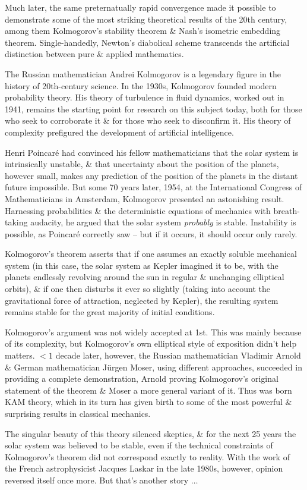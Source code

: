 \documentclass{article}
\begin{document}
\begin{enumerate}
	Much later, the same preternatually rapid convergence made it possible to demonstrate some of the most striking theoretical results of the 20th century, among them {\sc Kolmogorov}'s stability theorem \& {\sc Nash}'s isometric embedding theorem. Single-handedly, {\sc Newton}'s diabolical scheme transcends the artificial distinction between pure \& applied mathematics.
	
	The Russian mathematician {\sc Andrei Kolmogorov} is a legendary figure in the history of 20th-century science. In the 1930s, {\sc Kolmogorov} founded modern probability theory. His theory of turbulence in fluid dynamics, worked out in 1941, remains the starting point for research on this subject today, both for those who seek to corroborate it \& for those who seek to disconfirm it. His theory of complexity prefigured the development of artificial intelligence.
	
	{\sc Henri Poincar\'e} had convinced his fellow mathematicians that the solar system is intrinsically unstable, \& that uncertainty about the position of the planets, however small, makes any prediction of the position of the planets in the distant future impossible. But some 70 years later, 1954, at the International Congress of Mathematicians in Amsterdam, {\sc Kolmogorov} presented an astonishing result. Harnessing probabilities \& the deterministic equations of mechanics with breath-taking audacity, he argued that the solar system {\it probably} is stable. Instability is possible, as {\sc Poincar\'e} correctly saw -- but if it occurs, it should occur only rarely.
	
	{\sc Kolmogorov}'s theorem asserts that if one assumes an exactly soluble mechanical system (in this case, the solar system as {\sc Kepler} imagined it to be, with the planets endlessly revolving around the sun in regular \& unchanging elliptical orbits), \& if one then disturbs it ever so slightly (taking into account the gravitational force of attraction, neglected by {\sc Kepler}), the resulting system remains stable for the great majority of initial conditions.
	
	{\sc Kolmogorov}'s argument was not widely accepted at 1st. This was mainly because of its complexity, but {\sc Kolmogorov}'s own elliptical style of exposition didn't help matters. $< 1$ decade later, however, the Russian mathematician {\sc Vladimir Arnold} \& German mathematician {\sc J\"urgen Moser}, using different approaches, succeeded in providing a complete demonstration, {\sc Arnold} proving {\sc Kolmogorov}'s original statement of the theorem \& {\sc Moser} a more general variant of it. Thus was born KAM theory, which in its turn has given birth to some of the most powerful \& surprising results in classical mechanics.
	
	The singular beauty of this theory silenced skeptics, \& for the next 25 years the solar system was believed to be stable, even if the technical constraints of {\sc Kolmogorov}'s theorem did not correspond exactly to reality. With the work of the French astrophysicist {\sc Jacques Laskar} in the late 1980s, however, opinion reversed itself once more. But that's another story $\ldots$
\end{enumerate}
\end{document}
